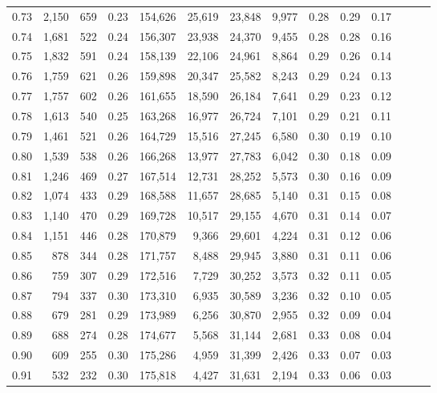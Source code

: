 \begin{tabular}{rrrrrrrrrrrrrr}
0.73 &  2,150 &  659 &  0.23 &  154,626 &   25,619 &  23,848 &   9,977 &  0.28 &  0.29 &      0.17 \\
0.74 &  1,681 &  522 &  0.24 &  156,307 &   23,938 &  24,370 &   9,455 &  0.28 &  0.28 &      0.16 \\
0.75 &  1,832 &  591 &  0.24 &  158,139 &   22,106 &  24,961 &   8,864 &  0.29 &  0.26 &      0.14 \\
0.76 &  1,759 &  621 &  0.26 &  159,898 &   20,347 &  25,582 &   8,243 &  0.29 &  0.24 &      0.13 \\
0.77 &  1,757 &  602 &  0.26 &  161,655 &   18,590 &  26,184 &   7,641 &  0.29 &  0.23 &      0.12 \\
0.78 &  1,613 &  540 &  0.25 &  163,268 &   16,977 &  26,724 &   7,101 &  0.29 &  0.21 &      0.11 \\
0.79 &  1,461 &  521 &  0.26 &  164,729 &   15,516 &  27,245 &   6,580 &  0.30 &  0.19 &      0.10 \\
0.80 &  1,539 &  538 &  0.26 &  166,268 &   13,977 &  27,783 &   6,042 &  0.30 &  0.18 &      0.09 \\
0.81 &  1,246 &  469 &  0.27 &  167,514 &   12,731 &  28,252 &   5,573 &  0.30 &  0.16 &      0.09 \\
0.82 &  1,074 &  433 &  0.29 &  168,588 &   11,657 &  28,685 &   5,140 &  0.31 &  0.15 &      0.08 \\
0.83 &  1,140 &  470 &  0.29 &  169,728 &   10,517 &  29,155 &   4,670 &  0.31 &  0.14 &      0.07 \\
0.84 &  1,151 &  446 &  0.28 &  170,879 &    9,366 &  29,601 &   4,224 &  0.31 &  0.12 &      0.06 \\
0.85 &    878 &  344 &  0.28 &  171,757 &    8,488 &  29,945 &   3,880 &  0.31 &  0.11 &      0.06 \\
0.86 &    759 &  307 &  0.29 &  172,516 &    7,729 &  30,252 &   3,573 &  0.32 &  0.11 &      0.05 \\
0.87 &    794 &  337 &  0.30 &  173,310 &    6,935 &  30,589 &   3,236 &  0.32 &  0.10 &      0.05 \\
0.88 &    679 &  281 &  0.29 &  173,989 &    6,256 &  30,870 &   2,955 &  0.32 &  0.09 &      0.04 \\
0.89 &    688 &  274 &  0.28 &  174,677 &    5,568 &  31,144 &   2,681 &  0.33 &  0.08 &      0.04 \\
0.90 &    609 &  255 &  0.30 &  175,286 &    4,959 &  31,399 &   2,426 &  0.33 &  0.07 &      0.03 \\
0.91 &    532 &  232 &  0.30 &  175,818 &    4,427 &  31,631 &   2,194 &  0.33 &  0.06 &      0.03 \\

\end{tabular}
